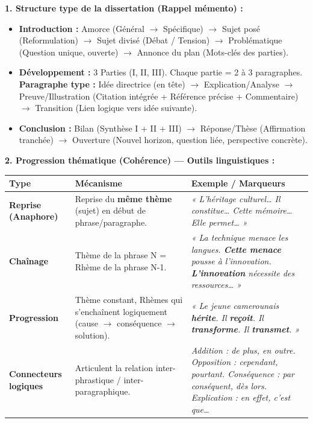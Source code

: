 \documentclass[11pt]{article}
\newcommand{\cle}[1]{{\popxbold\color{popdark}#1}}
\newcounter{popsec}
\newcounter{popsub}
\newcommand{\courssub}[1]{%
  \stepcounter{popsub}%
  \par\vspace{9pt}\noindent{\popxbold\fontsize{11.5}{13}\selectfont\color{popink}{\color{poporange}\thepopsec.\thepopsub}\hspace{6pt}#1}\par\nopagebreak\vspace{4pt}
}
\begin{document}
\courssub{Ressources à mobiliser}
\noindent \textbf{1. Structure type de la dissertation (Rappel mémento) :}
\begin{itemize}
    \item \textbf{Introduction :} \cle{Amorce} (Général $\rightarrow$ Spécifique) $\rightarrow$ \cle{Sujet posé} (Reformulation) $\rightarrow$ \cle{Sujet divisé} (Débat / Tension) $\rightarrow$ \cle{Problématique} (Question unique, ouverte) $\rightarrow$ \cle{Annonce du plan} (Mots-clés des parties).
    \item \textbf{Développement :} 3 Parties (I, II, III). Chaque partie = 2 à 3 paragraphes. \textbf{Paragraphe type :} \cle{Idée directrice} (en tête) $\rightarrow$ \cle{Explication/Analyse} $\rightarrow$ \cle{Preuve/Illustration} (Citation intégrée + Référence précise + Commentaire) $\rightarrow$ \cle{Transition} (Lien logique vers idée suivante).
    \item \textbf{Conclusion :} \cle{Bilan} (Synthèse I + II + III) $\rightarrow$ \cle{Réponse/Thèse} (Affirmation tranchée) $\rightarrow$ \cle{Ouverture} (Nouvel horizon, question liée, perspective concrète).
\end{itemize}

\noindent \textbf{2. Progression thématique (Cohérence) — Outils linguistiques :}
\begin{center}
    \begin{tabularx}{\linewidth}{|l|X|X|}\hline
    \rowcolor{popblueL} \textbf{Type} & \textbf{Mécanisme} & \textbf{Exemple / Marqueurs} \\ \hline
    \textbf{Reprise (Anaphore)} & Reprise du \textbf{même thème} (sujet) en début de phrase/paragraphe. & \textit{« L'héritage culturel… Il constitue… Cette mémoire… Elle permet… »} \\ \hline
    \textbf{Chaînage} & Thème de la phrase N = Rhème de la phrase N-1. & \textit{« La technique menace les langues. \textbf{Cette menace} pousse à l'innovation. \textbf{L'innovation} nécessite des ressources… »} \\ \hline
    \textbf{Progression} & Thème constant, Rhèmes qui s'enchaînent logiquement (cause $\rightarrow$ conséquence $\rightarrow$ solution). & \textit{« Le jeune camerounais \textbf{hérite}. Il \textbf{reçoit}. Il \textbf{transforme}. Il \textbf{transmet}. »} \\ \hline
    \textbf{Connecteurs logiques} & Articulent la relation inter-phrastique / inter-paragraphique. & \textit{Addition : de plus, en outre. Opposition : cependant, pourtant. Conséquence : par conséquent, dès lors. Explication : en effet, c'est que…} \\ \hline
    \end{tabularx}
\end{center}
\end{document}
